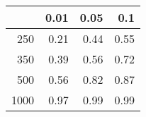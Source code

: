 % 
\begin{tabular}{rrrr}
  \hline
 & 0.01 & 0.05 & 0.1 \\ 
  \hline
250 & 0.21 & 0.44 & 0.55 \\ 
  350 & 0.39 & 0.56 & 0.72 \\ 
  500 & 0.56 & 0.82 & 0.87 \\ 
  1000 & 0.97 & 0.99 & 0.99 \\ 
   \hline
\end{tabular}
